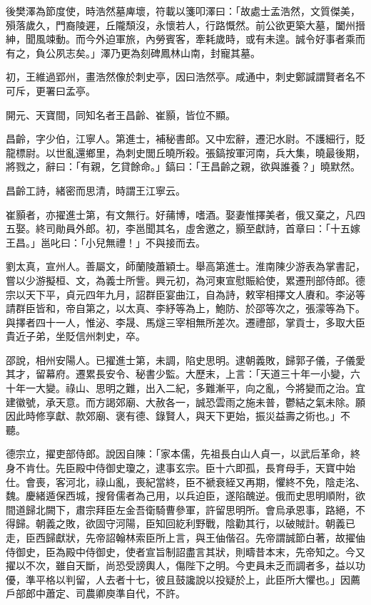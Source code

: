 \begin{pinyinscope}
 後樊澤為節度使，時浩然墓庳壞，符載以箋叩澤曰：「故處士孟浩然，文質傑美，殞落歲久，門裔陵遲，丘隴頹沒，永懷若人，行路慨然。前公欲更築大墓，闔州搢紳，聞風竦動。而今外迫軍旅，內勞賓客，牽耗歲時，或有未遑。誠令好事者乘而有之，負公夙志矣。」澤乃更為刻碑鳳林山南，封寵其墓。



 初，王維過郢州，畫浩然像於刺史亭，因曰浩然亭。咸通中，刺史鄭諴謂賢者名不可斥，更署曰孟亭。



 開元、天寶間，同知名者王昌齡、崔顥，皆位不顯。



 昌齡，字少伯，江寧人。第進士，補秘書郎。又中宏辭，遷汜水尉。不護細行，貶龍標尉。以世亂還鄉里，為刺史閭丘曉所殺。張鎬按軍河南，兵大集，曉最後期，將戮之，辭曰：「有親，乞貸餘命。」鎬曰：「王昌齡之親，欲與誰養？」曉默然。



 昌齡工詩，緒密而思清，時謂王江寧云。



 崔顥者，亦擢進士第，有文無行。好蒱博，嗜酒。娶妻惟擇美者，俄又棄之，凡四五娶。終司勛員外郎。初，李邕聞其名，虛舍邀之，顥至獻詩，首章曰：「十五嫁王昌。」邕叱曰：「小兒無禮！」不與接而去。



 劉太真，宣州人。善屬文，師蘭陵蕭穎士。舉高第進士。淮南陳少游表為掌書記，嘗以少游擬桓、文，為義士所訾。興元初，為河東宣慰賑給使，累遷刑部侍郎。德宗以天下平，貞元四年九月，詔群臣宴曲江，自為詩，敕宰相擇文人賡和。李泌等請群臣皆和，帝自第之，以太真、李紓等為上，鮑防、於邵等次之，張濛等為下。與擇者四十一人，惟泌、李晟、馬燧三宰相無所差次。遷禮部，掌貢士，多取大臣貴近子弟，坐貶信州刺史，卒。



 邵說，相州安陽人。已擢進士第，未調，陷史思明。逮朝義敗，歸郭子儀，子儀愛其才，留幕府。遷累長安令、秘書少監。大歷末，上言：「天道三十年一小變，六十年一大變。祿山、思明之難，出入二紀，多難漸平，向之亂，今將變而之治。宜建徽號，承天意。而方謁郊廟、大赦各一，誠恐雲雨之施未普，鬱結之氣未除。願因此時修享獻、款郊廟、褒有德、錄賢人，與天下更始，振災益壽之術也。」不聽。



 德宗立，擢吏部侍郎。說因自陳：「家本儒，先祖長白山人貞一，以武后革命，終身不肯仕。先臣殿中侍御史瓊之，逮事玄宗。臣十六即孤，長育母手，天寶中始仕。會喪，客河北，祿山亂，喪紀當終，臣不褫衰絰又再期，懼終不免，陰走洺、魏。慶緒遁保西城，搜脅儒者為己用，以兵迫臣，遂陷醜逆。俄而史思明順附，欲間道歸北闕下，肅宗拜臣左金吾衛騎曹參軍，許留思明所。會烏承恩事，路絕，不得歸。朝義之敗，欲固守河陽，臣知回紇利野戰，陰勸其行，以破賊計。朝義已走，臣西歸獻狀，先帝詔翰林索臣所上言，與王伷偕召。先帝謂誠節白著，故擢伷侍御史，臣為殿中侍御史，使者宣旨制詔盡言其狀，則疇昔本末，先帝知之。今又擢以不次，雖自天斷，尚恐受謗輿人，傷陛下之明。今吏員未乏而調者多，益以功優，準平格以判留，人去者十七，彼且鼓讒說以投疑於上，此臣所大懼也。」因薦戶部郎中蕭定、司農卿庾準自代，不許。




\end{pinyinscope}
